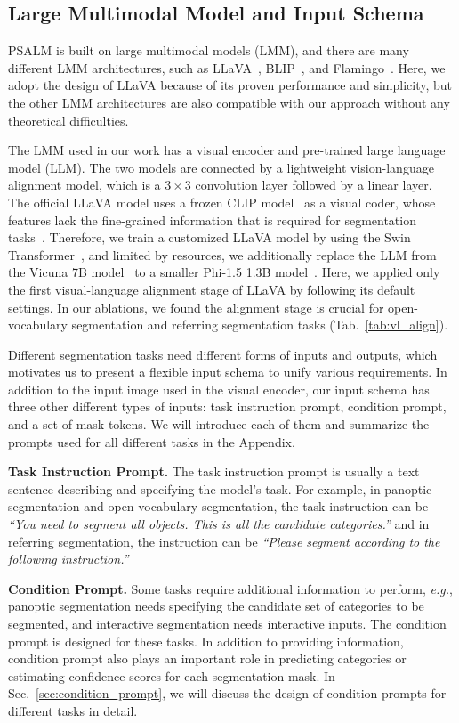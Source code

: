 \subsection{Large Multimodal Model and Input Schema}
PSALM is built on large multimodal models (LMM), and there are many different LMM architectures, such as LLaVA~\cite{llava}, BLIP~\cite{blip}, and Flamingo~\cite{flamingo}. Here, we adopt the design of LLaVA because of its proven performance and simplicity, but the other LMM architectures are also compatible with our approach without any theoretical difficulties.

The LMM used in our work has a visual encoder and pre-trained large language model (LLM). The two models are connected by a lightweight vision-language alignment model, which is a $3\times3$ convolution layer followed by a linear layer. 
The official LLaVA model uses a frozen CLIP model~\cite{CLIP} as a visual coder, whose features lack the fine-grained information that is required for segmentation tasks~\cite{SimBaseline}. Therefore, we train a customized LLaVA model by using the Swin Transformer~\cite{Swin}, and limited by resources, we additionally replace the LLM from the Vicuna 7B model~\cite{vicuna} to a smaller Phi-1.5 1.3B model~\cite{phi15}. Here, we applied only the first visual-language alignment stage of LLaVA by following its default settings. In our ablations, we found the alignment stage is crucial for open-vocabulary segmentation and referring segmentation tasks (Tab.~\ref{tab:vl_align}).

Different segmentation tasks need different forms of inputs and outputs, which motivates us to present a flexible input schema to unify various requirements. In addition to the input image used in the visual encoder, our input schema has three other different types of inputs: task instruction prompt, condition prompt, and a set of mask tokens. We will introduce each of them and summarize the prompts used for all different tasks in the Appendix. 

\noindent\textbf{Task Instruction Prompt.} The task instruction prompt is usually a text sentence describing and specifying the model's task. For example, in panoptic segmentation and open-vocabulary segmentation, the task instruction can be \textit{“You need to segment all objects. This is all the candidate categories.”} and in referring segmentation, the instruction can be \textit{“Please segment according to the following instruction.”} 

\noindent\textbf{Condition Prompt.} Some tasks require additional information to perform, \textit{e.g.}, panoptic segmentation needs specifying the candidate set of categories to be segmented, and interactive segmentation needs interactive inputs. The condition prompt is designed for these tasks. In addition to providing information, condition prompt also plays an important role in predicting categories or estimating confidence scores for each segmentation mask. In Sec.~\ref{sec:condition_prompt}, we will discuss the design of condition prompts for different tasks in detail.

